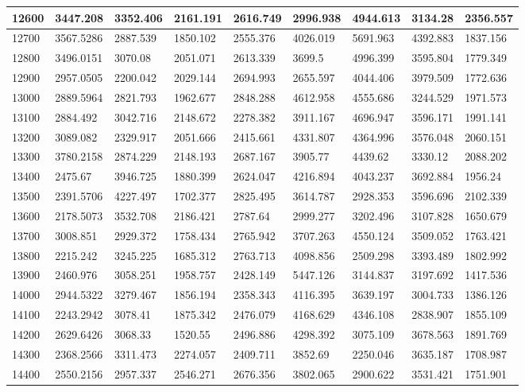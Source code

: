 \documentclass [11pt, proquest] {uwthesis}[2020/12/20]
\begin{document}
\begin{table}[]
\begin{tiny}
\begin{tabular}{|l|l|l|l|l|l|l|l|l|}
12600 & 3447.208 & 3352.406 & 2161.191 & 2616.749 & 2996.938 & 4944.613 & 3134.28 & 2356.557 \\ \hline
12700 & 3567.5286 & 2887.539 & 1850.102 & 2555.376 & 4026.019 & 5691.963 & 4392.883 & 1837.156 \\ \hline
12800 & 3496.0151 & 3070.08 & 2051.071 & 2613.339 & 3699.5 & 4996.399 & 3595.804 & 1779.349 \\ \hline
12900 & 2957.0505 & 2200.042 & 2029.144 & 2694.993 & 2655.597 & 4044.406 & 3979.509 & 1772.636 \\ \hline
13000 & 2889.5964 & 2821.793 & 1962.677 & 2848.288 & 4612.958 & 4555.686 & 3244.529 & 1971.573 \\ \hline
13100 & 2884.492 & 3042.716 & 2148.672 & 2278.382 & 3911.167 & 4696.947 & 3596.171 & 1991.141 \\ \hline
13200 & 3089.082 & 2329.917 & 2051.666 & 2415.661 & 4331.807 & 4364.996 & 3576.048 & 2060.151 \\ \hline
13300 & 3780.2158 & 2874.229 & 2148.193 & 2687.167 & 3905.77 & 4439.62 & 3330.12 & 2088.202 \\ \hline
13400 & 2475.67 & 3946.725 & 1880.399 & 2624.047 & 4216.894 & 4043.237 & 3692.884 & 1956.24 \\ \hline
13500 & 2391.5706 & 4227.497 & 1702.377 & 2825.495 & 3614.787 & 2928.353 & 3596.696 & 2102.339 \\ \hline
13600 & 2178.5073 & 3532.708 & 2186.421 & 2787.64 & 2999.277 & 3202.496 & 3107.828 & 1650.679 \\ \hline
13700 & 3008.851 & 2929.372 & 1758.434 & 2765.942 & 3707.263 & 4550.124 & 3509.052 & 1763.421 \\ \hline
13800 & 2215.242 & 3245.225 & 1685.312 & 2763.713 & 4098.856 & 2509.298 & 3393.489 & 1802.992 \\ \hline
13900 & 2460.976 & 3058.251 & 1958.757 & 2428.149 & 5447.126 & 3144.837 & 3197.692 & 1417.536 \\ \hline
14000 & 2944.5322 & 3279.467 & 1856.194 & 2358.343 & 4116.395 & 3639.197 & 3004.733 & 1386.126 \\ \hline
14100 & 2243.2942 & 3078.41 & 1875.342 & 2476.079 & 4168.629 & 4346.108 & 2838.907 & 1855.109 \\ \hline
14200 & 2629.6426 & 3068.33 & 1520.55 & 2496.886 & 4298.392 & 3075.109 & 3678.563 & 1891.769 \\ \hline
14300 & 2368.2566 & 3311.473 & 2274.057 & 2409.711 & 3852.69 & 2250.046 & 3635.187 & 1708.987 \\ \hline
14400 & 2550.2156 & 2957.337 & 2546.271 & 2676.356 & 3802.065 & 2900.622 & 3531.421 & 1751.901 \\ \hline

\end{tabular}
\end{tiny}
\end{table}
\end{document}

